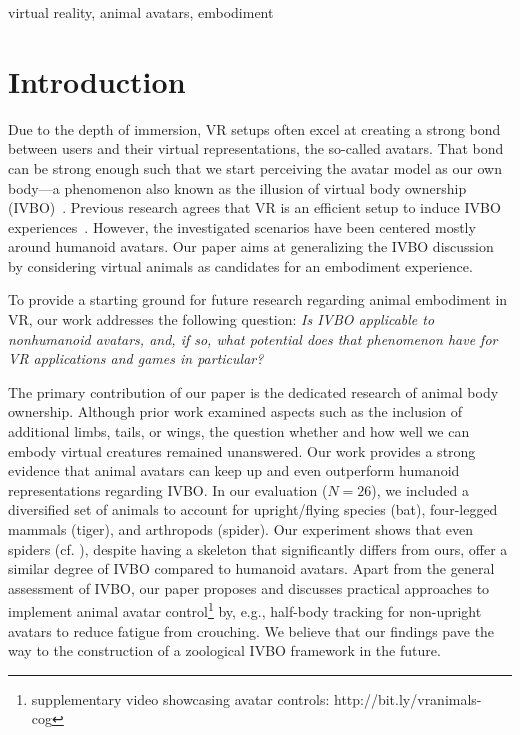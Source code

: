 \documentclass[conference]{IEEEtran}
\begin{document}
\begin{IEEEkeywords}
virtual reality, animal avatars, embodiment
\end{IEEEkeywords}

\section{Introduction}




Due to the depth of immersion, VR setups often excel at creating a strong bond between users and their virtual representations, the so-called avatars. That bond can be strong enough such that we start perceiving the avatar model as our own body---a phenomenon also known as the illusion of virtual body ownership (IVBO)~\cite{slater2010first}. Previous research agrees that VR is an efficient setup to induce IVBO experiences~\cite{slater2009inducing,slater2010first,waltemate2018impact}. However, the investigated scenarios have been centered mostly around humanoid avatars. Our paper aims at generalizing the IVBO discussion by considering virtual animals as candidates for an embodiment experience.

To provide a starting ground for future research regarding animal embodiment in VR, our work addresses the following question: \textit{Is IVBO applicable to nonhumanoid avatars, and, if so, what potential does that phenomenon have for VR applications and games in particular?} 

The primary contribution of our paper is the dedicated research of animal body ownership. Although prior work examined aspects such as the inclusion of additional limbs, tails, or wings, the question whether and how well we can embody virtual creatures remained unanswered. Our work provides a strong evidence that animal avatars can keep up and even outperform humanoid representations regarding IVBO. In our evaluation ($N=26$), we included a diversified set of animals to account for upright/flying species (bat), four-legged mammals (tiger), and arthropods (spider). Our experiment shows that even spiders (cf. ), despite having a skeleton that significantly differs from ours, offer a similar degree of IVBO compared to humanoid avatars. Apart from the general assessment of IVBO, our paper proposes and discusses practical approaches to implement animal avatar control\footnote{supplementary video showcasing avatar controls: http://bit.ly/vranimals-cog} by, e.g., half-body tracking for non-upright avatars to reduce fatigue from crouching. We believe that our findings pave the way to the construction of a zoological IVBO framework in the future.
\end{document}
